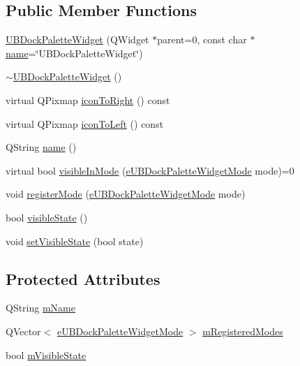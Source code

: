 \subsection*{Public Member Functions}
\begin{DoxyCompactItemize}
\item 
\hyperlink{class_u_b_dock_palette_widget_ae56c793e5cd0e20514e5e1519a59a7e0}{U\-B\-Dock\-Palette\-Widget} (Q\-Widget $\ast$parent=0, const char $\ast$\hyperlink{class_u_b_dock_palette_widget_a1c7779c0584c0d2541b4c05acc1ffbbb}{name}=\char`\"{}U\-B\-Dock\-Palette\-Widget\char`\"{})
\item 
\hyperlink{class_u_b_dock_palette_widget_aa6104aab54099aba93e58ebaa86780d0}{$\sim$\-U\-B\-Dock\-Palette\-Widget} ()
\item 
virtual Q\-Pixmap \hyperlink{class_u_b_dock_palette_widget_ac0e6c3f6468d43b112e5fc81bf2127dd}{icon\-To\-Right} () const 
\item 
virtual Q\-Pixmap \hyperlink{class_u_b_dock_palette_widget_a722c531dded95f4c728e92628fcef619}{icon\-To\-Left} () const 
\item 
Q\-String \hyperlink{class_u_b_dock_palette_widget_a1c7779c0584c0d2541b4c05acc1ffbbb}{name} ()
\item 
virtual bool \hyperlink{class_u_b_dock_palette_widget_ad009164555cbcfdf26f52e5939a1d843}{visible\-In\-Mode} (\hyperlink{_u_b_dock_palette_widget_8h_af3b2828ed1bf91ad13c73e4e1b3b529e}{e\-U\-B\-Dock\-Palette\-Widget\-Mode} mode)=0
\item 
void \hyperlink{class_u_b_dock_palette_widget_a981f3e2728bf17367f69704570f1bab4}{register\-Mode} (\hyperlink{_u_b_dock_palette_widget_8h_af3b2828ed1bf91ad13c73e4e1b3b529e}{e\-U\-B\-Dock\-Palette\-Widget\-Mode} mode)
\item 
bool \hyperlink{class_u_b_dock_palette_widget_a01341ae084f62d986ee2c2a9e0f51542}{visible\-State} ()
\item 
void \hyperlink{class_u_b_dock_palette_widget_a345e85fdfe36c21cde8567c515eace13}{set\-Visible\-State} (bool state)
\end{DoxyCompactItemize}
\subsection*{Protected Attributes}
\begin{DoxyCompactItemize}
\item 
Q\-String \hyperlink{class_u_b_dock_palette_widget_a6dbb15ff090986f543d2614778c343cb}{m\-Name}
\item 
Q\-Vector$<$ \hyperlink{_u_b_dock_palette_widget_8h_af3b2828ed1bf91ad13c73e4e1b3b529e}{e\-U\-B\-Dock\-Palette\-Widget\-Mode} $>$ \hyperlink{class_u_b_dock_palette_widget_a53e0db7a927af2934470ea519f67657d}{m\-Registered\-Modes}
\item 
bool \hyperlink{class_u_b_dock_palette_widget_a6625e60cb42b4fc13a91b307e24c9e3d}{m\-Visible\-State}
\end{DoxyCompactItemize}


